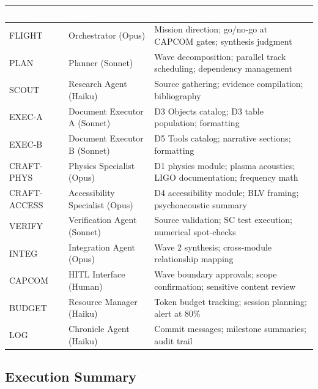 \documentclass[11pt,letterpaper]{article}
\newcommand{\tableheader}[1]{\textbf{\sffamily\textcolor{white}{#1}}}
\begin{document}
\begin{center}
\begin{tabularx}{\textwidth}{L{2cm}L{3.5cm}X}
\toprule
{}
\tableheader{Role} & \tableheader{Agent} & \tableheader{Primary Responsibility} \\
\midrule
FLIGHT & Orchestrator (Opus) & Mission direction; go/no-go at CAPCOM gates; synthesis judgment \\
PLAN & Planner (Sonnet) & Wave decomposition; parallel track scheduling; dependency management \\
SCOUT & Research Agent (Haiku) & Source gathering; evidence compilation; bibliography \\
EXEC-A & Document Executor A (Sonnet) & D3 Objects catalog; D3 table population; formatting \\
EXEC-B & Document Executor B (Sonnet) & D5 Tools catalog; narrative sections; formatting \\
CRAFT-PHYS & Physics Specialist (Opus) & D1 physics module; plasma acoustics; LIGO documentation; frequency math \\
CRAFT-ACCESS & Accessibility Specialist (Opus) & D4 accessibility module; BLV framing; psychoacoustic summary \\
VERIFY & Verification Agent (Sonnet) & Source validation; SC test execution; numerical spot-checks \\
INTEG & Integration Agent (Opus) & Wave 2 synthesis; cross-module relationship mapping \\
CAPCOM & HITL Interface (Human) & Wave boundary approvals; scope confirmation; sensitive content review \\
BUDGET & Resource Manager (Haiku) & Token budget tracking; session planning; alert at 80\% \\
LOG & Chronicle Agent (Haiku) & Commit messages; milestone summaries; audit trail \\
\bottomrule
\end{tabularx}
\end{center}

\subsection{Execution Summary}
\end{document}
